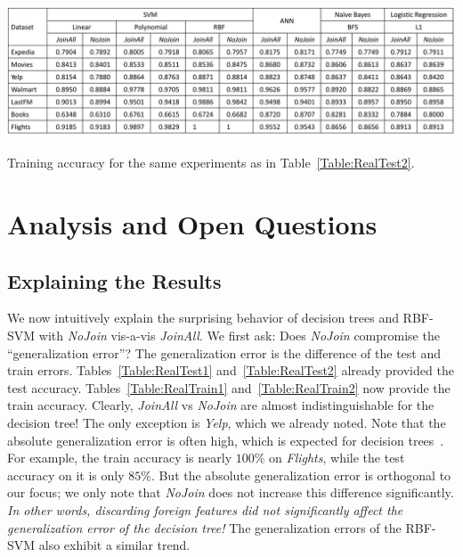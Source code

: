 \documentclass{vldb}
\begin{document}
\begin{table}[t]
\centering
\includegraphics[width=2\columnwidth]{table3-2.pdf}
\caption{Training accuracy for the same experiments as in Table~\ref{Table:RealTest2}.}
\label{Table:RealTrain2}
\end{table}

\section{Analysis and Open Questions}

\subsection{Explaining the Results}

We now intuitively explain the surprising behavior of decision trees and RBF-SVM with \textit{NoJoin} vis-a-vis \textit{JoinAll}.
We first ask: {Does \textit{NoJoin} compromise the ``generalization error''?} The generalization error is the difference of the test and train errors.
Tables~\ref{Table:RealTest1} and~\ref{Table:RealTest2} already provided the test accuracy. 
Tables~\ref{Table:RealTrain1} and~\ref{Table:RealTrain2} now provide the train accuracy. Clearly, \textit{JoinAll} vs 
\textit{NoJoin} are almost indistinguishable for the decision tree! The only exception is \textit{Yelp}, which we already noted. 
Note that the absolute generalization error is often high, which is expected for decision trees~\cite{dtreebias2}. 
For example, the train accuracy is nearly $100\%$ on \textit{Flights}, while the test accuracy on it is only $85\%$.
But the absolute generalization error is orthogonal to our focus; we only note that \textit{NoJoin} does not increase this difference significantly.
\textit{In other words, discarding foreign features did not significantly affect the generalization error of the decision tree!} 
The generalization errors of the RBF-SVM also exhibit a similar trend.
\end{document}
